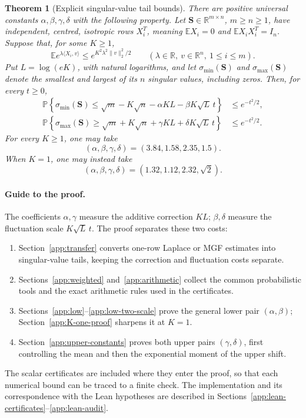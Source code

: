 \documentclass[11pt,a4paper]{article}
\newcommand{\Ess}{\mathbf{S}}
\numberwithin{equation}{section}
\newtheorem{theorem}{Theorem}[section]
\begin{document}
\begin{theorem}[Explicit singular-value tail bounds]
\label{thm:explicit-constants}
There are positive universal constants $\alpha,\beta,\gamma,\delta$
with the following property.
Let $\Ess\in\mathbb R^{m\times n}$, $m\ge n\ge1$, have independent,
centred, isotropic rows $X_i^T$, meaning
$\mathbb EX_i=0$ and $\mathbb EX_iX_i^T=I_n$.
Suppose that, for some $K\ge1$,
\[
 \mathbb E e^{\lambda\langle X_i,v\rangle}
 \le e^{K^2\lambda^2\|v\|_2^2/2}
 \qquad(\lambda\in\mathbb R,\ v\in\mathbb R^n,\ 1\le i\le m).
\]
Put $L=\log(eK)$, with natural logarithms, and let
$\sigma_{\min}(\Ess)$ and $\sigma_{\max}(\Ess)$ denote the smallest
and largest of its $n$ singular values, including zeros.
Then, for every $t\ge0$,
\begin{align}
 \mathbb P\left\{\sigma_{\min}(\Ess)\le\sqrt m-K\sqrt n
             -\alpha KL-\beta K\sqrt L\,t\right\}
 &\le e^{-t^2/2},\label{eq:supp-lower-tail}\\
 \mathbb P\left\{\sigma_{\max}(\Ess)\ge\sqrt m+K\sqrt n
             +\gamma KL+\delta K\sqrt L\,t\right\}
 &\le e^{-t^2/2}.\label{eq:supp-upper-tail}
\end{align}
For every $K\ge1$, one may take
\begin{equation}\label{eq:supp-general-constants}
 (\alpha,\beta,\gamma,\delta)=(3.84,1.58,2.35,1.5).
\end{equation}
When $K=1$, one may instead take
\begin{equation}\label{eq:supp-K-one-constants}
 (\alpha,\beta,\gamma,\delta)=(1.32,1.12,2.32,\sqrt2).
\end{equation}
\end{theorem}

\paragraph{Guide to the proof.}
The coefficients $\alpha,\gamma$ measure the additive correction $KL$;
$\beta,\delta$ measure the fluctuation scale $K\sqrt L\,t$.
The proof separates these two costs:
\begin{enumerate}
\item Section~\ref{app:transfer} converts one-row Laplace or MGF estimates
into singular-value tails, keeping the correction and fluctuation costs separate.
\item Sections~\ref{app:weighted} and~\ref{app:arithmetic} collect the common
probabilistic tools and the exact arithmetic rules used in the certificates.
\item Sections~\ref{app:low}--\ref{app:low-two-scale} prove the general lower
pair $(\alpha,\beta)$; Section~\ref{app:K-one-proof} sharpens it at $K=1$.
\item Section~\ref{app:upper-constants} proves both upper pairs
$(\gamma,\delta)$, first controlling the mean and then the exponential moment
of the upper shift.
\end{enumerate}
The scalar certificates are included where they enter the proof, so that each
numerical bound can be traced to a finite check. The implementation and its
correspondence with the Lean hypotheses are described in
Sections~\ref{app:lean-certificates}--\ref{app:lean-audit}.
\end{document}
